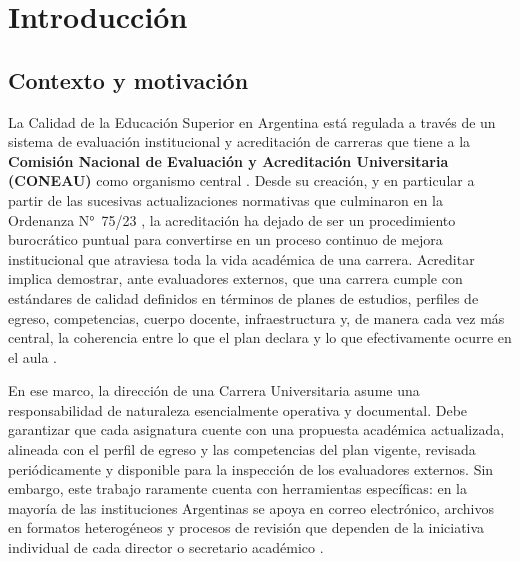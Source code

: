 \chapter{Introducción}
\label{ch:introduccion}

\section{Contexto y motivación}
\label{sec:contexto}

La Calidad de la Educación Superior en Argentina está regulada a través de un sistema de evaluación institucional y acreditación de carreras que tiene a la \textbf{Comisión Nacional de Evaluación y Acreditación Universitaria (CONEAU)} como organismo central \citep{ordenanza62}. Desde su creación, y en particular a partir de las sucesivas actualizaciones normativas que culminaron en la Ordenanza N°~75/23 \citep{ordenanza75}, la acreditación ha dejado de ser un procedimiento burocrático puntual para convertirse en un proceso continuo de mejora institucional que atraviesa toda la vida académica de una carrera. Acreditar implica demostrar, ante evaluadores externos, que una carrera cumple con estándares de calidad definidos en términos de planes de estudios, perfiles de egreso, competencias, cuerpo docente, infraestructura y, de manera cada vez más central, la coherencia entre lo que el plan declara y lo que efectivamente ocurre en el aula \citep{GuzmanForestello2015, coneaUacreditacion2019}.

En ese marco, la dirección de una Carrera Universitaria asume una responsabilidad de naturaleza esencialmente operativa y documental. Debe garantizar que cada asignatura cuente con una propuesta académica actualizada, alineada con el perfil de egreso y las competencias del plan vigente, revisada periódicamente y disponible para la inspección de los evaluadores externos. Sin embargo, este trabajo raramente cuenta con herramientas específicas: en la mayoría de las instituciones Argentinas se apoya en correo electrónico, archivos en formatos heterogéneos y procesos de revisión que dependen de la iniciativa individual de cada director o secretario académico \citep{sanabria2023procesos}.

